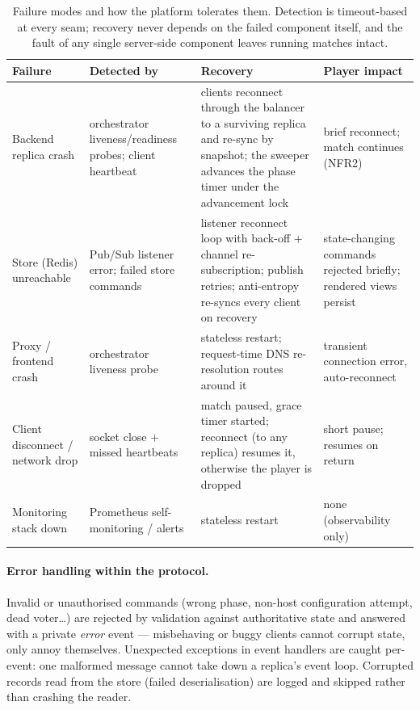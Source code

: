 \documentclass{scrartcl}
\begin{document}
\begin{table}[H]
  \centering
  \footnotesize
  \setlength{\tabcolsep}{6pt}
  \renewcommand{\arraystretch}{1.3}
  \caption{Failure modes and how the platform tolerates them. Detection is
    timeout-based at every seam; recovery never depends on the failed
    component itself, and the fault of any single server-side component
    leaves running matches intact.}
  \label{tab:failure-modes}
  \begin{tabular}{@{}
    >{\raggedright\arraybackslash}p{2.4cm}
    >{\raggedright\arraybackslash}p{3.1cm}
    >{\raggedright\arraybackslash}p{4.8cm}
    >{\raggedright\arraybackslash}p{2.6cm}@{}}
    \toprule
    \textbf{Failure} & \textbf{Detected by} & \textbf{Recovery}
      & \textbf{Player impact} \\
    \midrule
    Backend replica crash
      & orchestrator liveness/readiness probes; client heartbeat
      & clients reconnect through the balancer to a surviving replica and
        re-sync by snapshot; the sweeper advances the phase timer under the
        advancement lock
      & brief reconnect; match continues (NFR2) \\
    Store (Redis) unreachable
      & Pub/Sub listener error; failed store commands
      & listener reconnect loop with back-off $+$ channel re-subscription;
        publish retries; anti-entropy re-syncs every client on recovery
      & state-changing commands rejected briefly; rendered views persist \\
    Proxy / frontend crash
      & orchestrator liveness probe
      & stateless restart; request-time DNS re-resolution routes around it
      & transient connection error, auto-reconnect \\
    Client disconnect / network drop
      & socket close $+$ missed heartbeats
      & match paused, grace timer started; reconnect (to any replica)
        resumes it, otherwise the player is dropped
      & short pause; resumes on return \\
    Monitoring stack down
      & Prometheus self-monitoring / alerts
      & stateless restart
      & none (observability only) \\
    \bottomrule
  \end{tabular}
\end{table}

\paragraph{Error handling within the protocol.}
Invalid or unauthorised commands (wrong phase, non-host configuration
attempt, dead voter\ldots) are rejected by validation against
authoritative state and answered with a private \emph{error} event ---
misbehaving or buggy clients cannot corrupt state, only annoy themselves.
Unexpected exceptions in event handlers are caught per-event: one
malformed message cannot take down a replica's event loop. Corrupted
records read from the store (failed deserialisation) are logged and
skipped rather than crashing the reader.
\end{document}
